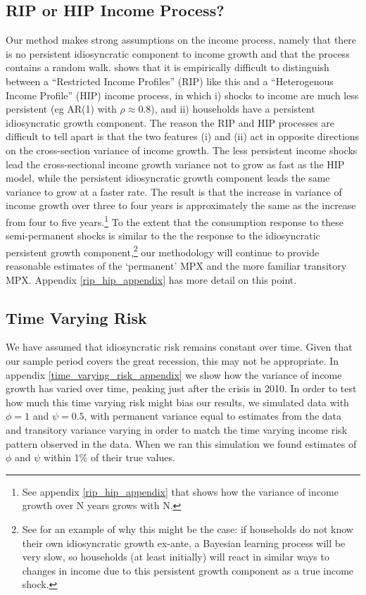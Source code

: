 \documentclass[titlepage]{\econtex}\newcommand{\texname}{ConsumptionHeterogeneity}
\begin{document}
\subsection{RIP or HIP Income Process?} \label{rip_hip}
Our method makes strong assumptions on the income process, namely that there is no persistent idiosyncratic component to income growth and that the process contains a random walk. \cite{guvenen_empirical_2009} shows that it is empirically difficult to distinguish between a ``Restricted Income Profiles'' (RIP) like this and a ``Heterogenous Income Profile'' (HIP) income process, in which i) shocks to income are much less persistent (eg AR(1) with $\rho\approx 0.8$), and ii) households have a persistent idiosyncratic growth component. The reason the RIP and HIP processes are difficult to tell apart is that the two features (i) and (ii) act in opposite directions on the cross-section variance of income growth. The less persistent income shocks lead the cross-sectional income growth variance not to grow as fast as the HIP model, while the persistent idiosyncratic growth component leads the same variance to grow at a faster rate. The result is that the increase in variance of income growth over three to four years is approximately the same as the increase from four to five years.\footnote{See appendix \ref{rip_hip_appendix} that shows how the variance of income growth over N years grows with N.} To the extent that the consumption response to these semi-permanent shocks is similar to the the response to the idiosyncratic persistent growth component,\footnote{See \cite{guvenen_learning_2007} for an example of why this might be the case: if households do not know their own idiosyncratic growth ex-ante, a Bayesian learning process will be very slow, so households (at least initially) will react in similar ways to changes in income due to this persistent growth component as a true income shock.} our methodology will continue to provide reasonable estimates of the `permanent' MPX and the more familiar transitory MPX. Appendix \ref{rip_hip_appendix} has more detail on this point.

\subsection{Time Varying Risk} \label{time_varying_risk}
We have assumed that idiosyncratic risk remains constant over time. Given that our sample period covers the great recession, this may not be appropriate. In appendix \ref{time_varying_risk_appendix} we show how the variance of income growth has varied over time, peaking just after the crisis in 2010. In order to test how much this time varying risk might bias our results, we simulated data with $\phi=1$ and $\psi=0.5$, with permanent variance equal to estimates from the data and transitory variance varying in order to match the time varying income risk pattern observed in the data. When we ran this simulation we found estimates of $\phi$ and $\psi$ within 1\% of their true values.
\end{document}
